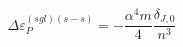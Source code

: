 \begin{equation}
\Delta \varepsilon _{P}^{(sgl)\left( s-s\right) }=-\frac{\alpha ^{4}m}{4}%
\frac{\delta _{J,0}}{n^{3}}
\end{equation}

